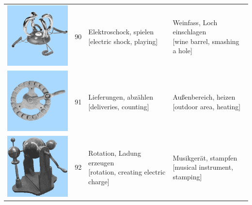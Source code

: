 \documentclass[
  english,
  doc,12pt,twoside,floatsintext]{apa7}
\begin{document}
\begin{center}
\begin{ThreePartTable}
{\begin{longtable}{llll}
\includegraphics[valign=c, scale=0.23]{../materials/unfamiliar/90.png} & 90 & \makecell[l]{Elektroschock, spielen\\{[electric shock, playing]}} & \makecell[l]{Weinfass, Loch einschlagen\\{[wine barrel, smashing a hole]}}\\
\includegraphics[valign=c, scale=0.23]{../materials/unfamiliar/91.png} & 91 & \makecell[l]{Lieferungen, abzählen\\{[deliveries, counting]}} & \makecell[l]{Außenbereich, heizen\\{[outdoor area, heating]}}\\
\includegraphics[valign=c, scale=0.23]{../materials/unfamiliar/92.png} & 92 & \makecell[l]{Rotation, Ladung erzeugen\\{[rotation, creating electric charge]}} & \makecell[l]{Musikgerät, stampfen\\{[musical instrument, stamping]}}\\

\end{longtable}}
\end{ThreePartTable}
\end{center}
\end{document}
